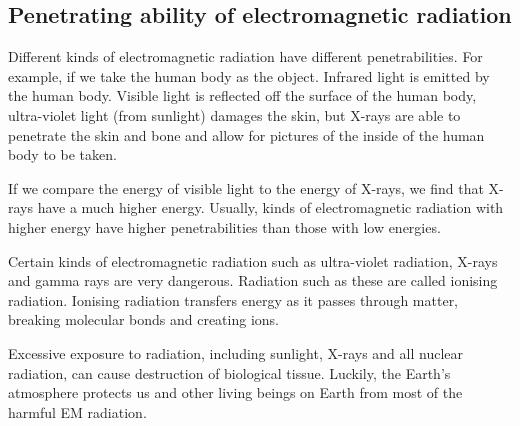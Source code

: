             \subsection{ Penetrating ability of electromagnetic radiation}
            \nopagebreak
      \label{m38779*id189450}Different kinds of electromagnetic radiation have different penetrabilities. For example, if we take the human body as the object. Infrared light is emitted by the human body. Visible light is reflected off the surface of the human body, ultra-violet light (from sunlight) damages the skin, but X-rays are able to penetrate the skin and bone and allow for pictures of the inside of the human body to be taken.\par 
      \label{m38779*id189457}If we compare the energy of visible light to the energy of X-rays, we find that X-rays have a much higher energy. Usually, kinds of electromagnetic radiation with higher energy have higher penetrabilities than those with low energies.\par 
      \label{m38779*id189462}Certain kinds of electromagnetic radiation such as ultra-violet radiation, X-rays and gamma rays are very dangerous. Radiation such as these are called ionising radiation. Ionising radiation transfers energy as it passes through matter, breaking molecular bonds and creating ions.\par 
      \label{m38779*id189468}Excessive exposure to radiation, including sunlight, X-rays and all nuclear radiation, can cause destruction of biological tissue. Luckily, the Earth's atmosphere protects us and other living beings on Earth from most of the harmful EM radiation.\par 
      \label{m38779*uid17}
